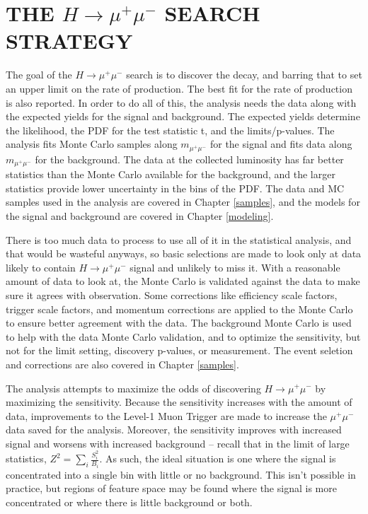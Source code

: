 \chapter{THE $H\rightarrow\mu^+\mu^-$ SEARCH STRATEGY} \label{strategy}

The goal of the $H\rightarrow\mu^+\mu^-$ search is to discover the decay, and barring that to set an upper limit on the rate of production. The best fit for the rate of production is also reported. In order to do all of this, the analysis needs the data along with the expected yields for the signal and background. The expected yields determine the likelihood, the PDF for the test statistic t, and the limits/p-values. The analysis fits Monte Carlo samples along $m_{\mu^+\mu^-}$ for the signal and fits data along $m_{\mu^+\mu^-}$ for the background. The data at the collected luminosity has far better statistics than the Monte Carlo available for the background, and the larger statistics provide lower uncertainty in the bins of the PDF. The data and MC samples used in the analysis are covered in Chapter \ref{samples}, and the models for the signal and background are covered in Chapter \ref{modeling}. 

There is too much data to process to use all of it in the statistical analysis, and that would be wasteful anyways, so basic selections are made to look only at data likely to contain $H\rightarrow\mu^+\mu^-$ signal and unlikely to miss it. With a reasonable amount of data to look at, the Monte Carlo is validated against the data to make sure it agrees with observation. Some corrections like efficiency scale factors, trigger scale factors, and momentum corrections are applied to the Monte Carlo to ensure better agreement with the data. The background Monte Carlo is used to help with the data Monte Carlo validation, and to optimize the sensitivity, but not for the limit setting, discovery p-values, or measurement. The event seletion and corrections are also covered in Chapter \ref{samples}. 

The analysis attempts to maximize the odds of discovering $H\rightarrow\mu^+\mu^-$ by maximizing the sensitivity. Because the sensitivity increases with the amount of data, improvements to the Level-1 Muon Trigger are made to increase the $\mu^+\mu^-$ data saved for the analysis. Moreover, the sensitivity improves with increased signal and worsens with increased background -- recall that in the limit of large statistics, $Z^2=\sum_i\frac{S_i^2}{B_i}$. As such, the ideal situation is one where the signal is concentrated into a single bin with little or no background. This isn't possible in practice, but regions of feature space may be found where the signal is more concentrated or where there is little background or both. 


